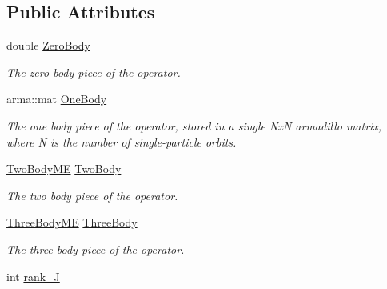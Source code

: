 \subsection*{Public Attributes}
\begin{DoxyCompactItemize}
\item 
\hypertarget{classOperator_a2f9f1109333a2485083cc7c090f9cd26}{double \hyperlink{classOperator_a2f9f1109333a2485083cc7c090f9cd26}{Zero\-Body}}\label{classOperator_a2f9f1109333a2485083cc7c090f9cd26}

\begin{DoxyCompactList}\small\item\em The zero body piece of the operator. \end{DoxyCompactList}\item 
\hypertarget{classOperator_a14b1c78e0be45772aa57168c74d1b57c}{arma\-::mat \hyperlink{classOperator_a14b1c78e0be45772aa57168c74d1b57c}{One\-Body}}\label{classOperator_a14b1c78e0be45772aa57168c74d1b57c}

\begin{DoxyCompactList}\small\item\em The one body piece of the operator, stored in a single Nx\-N armadillo matrix, where N is the number of single-\/particle orbits. \end{DoxyCompactList}\item 
\hypertarget{classOperator_add51ac69970faff9936192fec4181e00}{\hyperlink{classTwoBodyME}{Two\-Body\-M\-E} \hyperlink{classOperator_add51ac69970faff9936192fec4181e00}{Two\-Body}}\label{classOperator_add51ac69970faff9936192fec4181e00}

\begin{DoxyCompactList}\small\item\em The two body piece of the operator. \end{DoxyCompactList}\item 
\hypertarget{classOperator_ac9d7e28ec1958d5065e12cbf0c0e3541}{\hyperlink{classThreeBodyME}{Three\-Body\-M\-E} \hyperlink{classOperator_ac9d7e28ec1958d5065e12cbf0c0e3541}{Three\-Body}}\label{classOperator_ac9d7e28ec1958d5065e12cbf0c0e3541}

\begin{DoxyCompactList}\small\item\em The three body piece of the operator. \end{DoxyCompactList}\item 
\hypertarget{classOperator_a71a7c194800e2758c42ad0d5f30299aa}{int \hyperlink{classOperator_a71a7c194800e2758c42ad0d5f30299aa}{rank\-\_\-\-J}}\label{classOperator_a71a7c194800e2758c42ad0d5f30299aa}


\end{DoxyCompactItemize}
